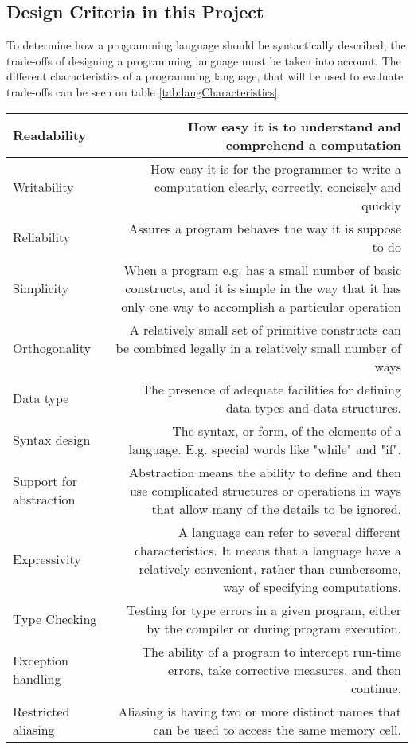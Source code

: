 \subsection{Design Criteria in this Project}
\label{sec:DesignCriteria}
To determine how a programming language should be syntactically described, the trade-offs of designing a programming language must be taken into account. The different characteristics of a programming language, that will be used to evaluate trade-offs can be seen on table \ref{tab:langCharacteristics}.
\begin{table}[H]
	\begin{tabularx}{\textwidth}{|l|R|}
		\hline
		
		Readability				& How easy it is to understand and comprehend a computation 		\\ \hline
		Writability				& How easy it is for the programmer to write a computation clearly, correctly, concisely and quickly\\ \hline
		Reliability 			& Assures a program behaves the way it is suppose to do	\\ \hline
		Simplicity				& When a program e.g. has a small number of basic constructs, and it is simple in the way that it has only one way to 									accomplish a particular operation\\ \hline
		Orthogonality 			& A relatively small set of primitive constructs can be combined legally in a relatively small number of ways\\ \hline	
		Data type				& The presence of adequate facilities for defining data types and data structures.\\ \hline
		Syntax design			& The syntax, or form, of the elements of a language. E.g. special words like "while" and "if".\\ \hline
		Support for abstraction	& Abstraction means the ability to define and then use complicated structures or operations in ways that allow many of the 									details	to be ignored.\\ \hline
		Expressivity			& A language can refer to several different characteristics. It means that a language have a relatively convenient, rather 									than cumbersome, way of specifying computations.\\ \hline
		Type Checking			& Testing for type errors in a given program, either by the compiler or during program execution.\\ \hline
		Exception handling		& The ability of a program to intercept run-time errors, take corrective measures, and then continue.\\ \hline
		Restricted aliasing		& Aliasing is having two or more distinct names that can be used to	access the same memory cell.\\ \hline
		

\end{tabularx}
\end{table}
